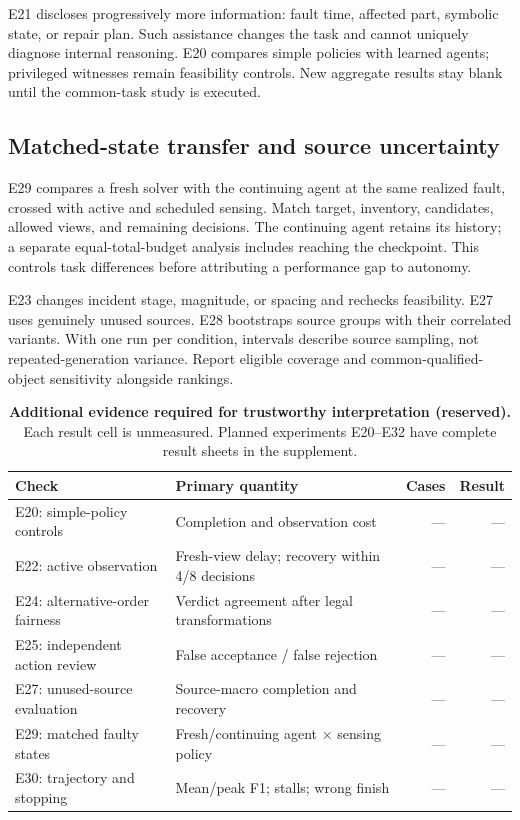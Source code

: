 \documentclass[10pt,twocolumn,letterpaper]{article}
\begin{document}
E21 discloses progressively more information: fault time, affected part, symbolic state, or repair plan. Such assistance changes the task and cannot uniquely diagnose internal reasoning. E20 compares simple policies with learned agents; privileged witnesses remain feasibility controls. New aggregate results stay blank until the common-task study is executed.

\subsection{Matched-state transfer and source uncertainty}
E29 compares a fresh solver with the continuing agent at the same realized fault, crossed with active and scheduled sensing. Match target, inventory, candidates, allowed views, and remaining decisions. The continuing agent retains its history; a separate equal-total-budget analysis includes reaching the checkpoint. This controls task differences before attributing a performance gap to autonomy.

E23 changes incident stage, magnitude, or spacing and rechecks feasibility. E27 uses genuinely unused sources. E28 bootstraps source groups with their correlated variants. With one run per condition, intervals describe source sampling, not repeated-generation variance. Report eligible coverage and common-qualified-object sensitivity alongside rankings.

\begin{table}[t]\centering\small
\caption{\textbf{Additional evidence required for trustworthy interpretation (reserved).} Each result cell is unmeasured. Planned experiments E20--E32 have complete result sheets in the supplement.}
\label{tab:validity-plan}
\begin{tabularx}{\textwidth}{@{}YYrr@{}}\toprule
Check & Primary quantity & Cases & Result\\\midrule
E20: simple-policy controls & Completion and observation cost & --- & ---\\
E22: active observation & Fresh-view delay; recovery within 4/8 decisions & --- & ---\\
E24: alternative-order fairness & Verdict agreement after legal transformations & --- & ---\\
E25: independent action review & False acceptance / false rejection & --- & ---\\
E27: unused-source evaluation & Source-macro completion and recovery & --- & ---\\
E29: matched faulty states & Fresh/continuing agent $\times$ sensing policy & --- & ---\\
E30: trajectory and stopping & Mean/peak F1; stalls; wrong finish & --- & ---\\\bottomrule
\end{tabularx}\end{table}
\end{document}
